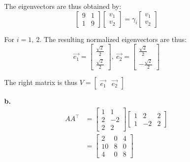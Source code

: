 \documentclass[oneside,12pt,letterpaper]{article}
\begin{document}
\begin{enumerate}
\begin{enumerate}
					The eigenvectors are thus obtained by: 
					$$\begin{bmatrix}
						9 & 1 \\
						1 & 9
					\end{bmatrix}
					\begin{bmatrix}
						v_{1} \\
						v_{2}
					\end{bmatrix}
					= \gamma_{i} 
					\begin{bmatrix}
						v_{1} \\
						v_{2}
					\end{bmatrix}$$

					For $i=1,\ 2$. The resulting normalized eigenvectors are thus:
					$$\vec{e_{1}} =
					\begin{bmatrix}
						\frac{\sqrt{2}}{2} \\
						\frac{\sqrt{2}}{2}
					\end{bmatrix},\ 
					\vec{e_{2}} =
					\begin{bmatrix}
						\frac{\sqrt{2}}{2} \\
						-\frac{\sqrt{2}}{2}
					\end{bmatrix}$$

					The right matrix is thus $V = \begin{bmatrix} \vec{e_{1}} & \vec{e_{2}} \end{bmatrix}$

				\item[\textbf{b.}]
					\begin{align*}
						AA^\intercal &= 
						\begin{bmatrix}
							1 & 1 \\
							2 & -2 \\
							2 & 2
						\end{bmatrix}
						\begin{bmatrix}
							1 & 2 & 2 \\
							1 & -2 & 2
						\end{bmatrix} \\
													&=
													\begin{bmatrix}
														2 & 0 & 4 \\
														10 & 8 & 0 \\
														4 & 0 & 8
													\end{bmatrix}
					\end{align*}


\end{enumerate}
\end{enumerate}
\end{document}
